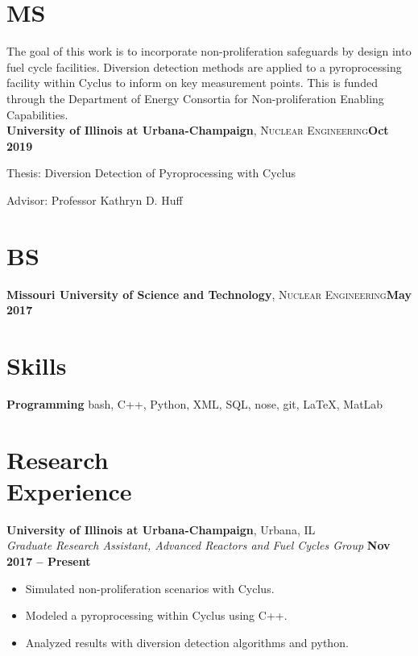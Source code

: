 \documentclass[margin,line]{resume}
\begin{document}
\begin{resume}
    \section{\mysidestyle MS}
    The goal of this work is to incorporate non-proliferation safeguards by design into fuel cycle facilities. Diversion detection methods are applied to a pyroprocessing facility
    within Cyclus to inform on key measurement points. This is funded through the
    Department of Energy Consortia for Non-proliferation Enabling Capabilities.\\
    \textbf{University of Illinois at Urbana-Champaign}, \textsc{Nuclear Engineering}\hfill \textbf{Oct 2019}\vspace{-3mm}\\\vspace{-1mm}%
    \begin{list2}
        \item Thesis: Diversion Detection of Pyroprocessing with Cyclus
        \item Advisor:  Professor Kathryn D. Huff
    \end{list2}\vspace{-1.5mm}
    \section{\mysidestyle BS}
    \textbf{Missouri University of Science and Technology}, \textsc{Nuclear Engineering}\hfill\textbf{May 2017}\vspace{-3mm}\\\vspace{-1mm}%
    \section{\mysidestyle Skills}
    \textbf{Programming} \hfill bash, C++, Python, XML, SQL, nose, git, \LaTeX, MatLab\vspace{.5mm}%
    \section{\mysidestyle Research\\Experience}
    \textbf{University of Illinois at Urbana-Champaign}, Urbana, IL\\
		\textsl{Graduate Research Assistant, Advanced Reactors and Fuel Cycles Group} \hfill \textbf{Nov 2017 -- Present}\\
		\begin{itemize}
			\item Simulated non-proliferation scenarios with Cyclus.
			\item Modeled a pyroprocessing within Cyclus using C++.
			\item Analyzed results with diversion detection algorithms and python.
		\end{itemize}


\end{resume}
\end{document}
